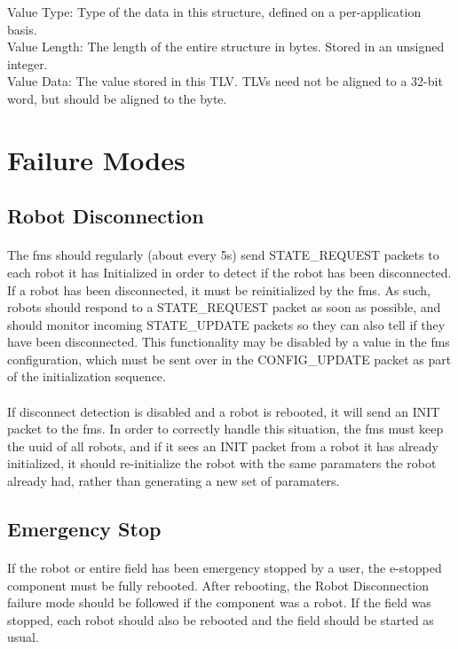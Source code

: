 \documentclass[11pt]{article}
\begin{document}
Value Type: Type of the data in this structure, defined on a per-application basis. \\
Value Length: The length of the entire structure in bytes.  Stored in an unsigned integer. \\
Value Data: The value stored in this TLV. TLVs need not be aligned to a 32-bit word, but should be aligned to the byte. \\

\clearpage

\section{Failure Modes}
\subsection{Robot Disconnection}
\paragraph{}
The \acrshort{fms} should regularly (about every 5s) send STATE\_REQUEST packets to each robot it has Initialized 
in order to detect if the robot has been disconnected.  If a robot has been disconnected, 
it must be reinitialized by the \acrshort{fms}.
As such, robots should respond to a STATE\_REQUEST packet as soon as possible, and should monitor incoming STATE\_UPDATE packets
so they can also tell if they have been disconnected.  This functionality may be disabled by a value in the \acrshort{fms}
configuration, which must be sent over in the CONFIG\_UPDATE packet as part of the initialization sequence.

\paragraph{}
If disconnect detection is disabled and a robot is rebooted, it will send an INIT packet to the \acrshort{fms}.
In order to correctly handle this situation, the \acrshort{fms} must keep the \acrshort{uuid} of all robots, 
and if it sees an INIT packet from a robot it has already initialized, 
it should re-initialize the robot with the same paramaters the robot already had, rather
than generating a new set of paramaters.

\subsection{Emergency Stop}
\paragraph{}
If the robot or entire field has been emergency stopped by a user, the e-stopped component must be fully rebooted.
After rebooting, the Robot Disconnection failure mode should be followed if the component was a robot.  
If the field was stopped, each robot should also be rebooted and the field should be started as usual.

\clearpage

\printglossary[type=\acronymtype]
\end{document}

